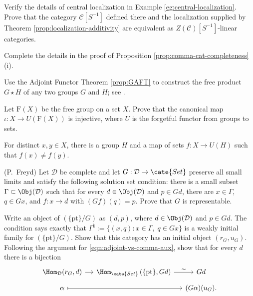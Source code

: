 \begin{Exercises}
	\item Verify the details of central localization in Example
	\ref{eg:central-localization}. Prove that the category
	$\mathcal{C}[S^{-1}]$ defined there and the localization supplied by
	Theorem \ref{prop:localization-additivity} are equivalent as
	$Z(\mathcal{C})[S^{-1}]$-linear categories.

	\item Complete the details in the proof of Proposition
	\ref{prop:comma-cat-completeness}(i).

	\item Use the Adjoint Functor Theorem \ref{prop:GAFT} to construct the free
	product $G\star H$ of any two groups $G$ and $H$; see
	\cite[Definition 4.8.9]{Li1}.

	\item Let $\mathrm{F}(X)$ be the free group on a set $X$. Prove that the
	canonical map $\iota:X\to U(\mathrm{F}(X))$ is injective, where $U$ is the
	forgetful functor from groups to sets.
	\begin{hint}
		For distinct $x,y\in X$, there is a group $H$ and a map of sets
		$f:X\to U(H)$ such that $f(x)\ne f(y)$.
	\end{hint}

	\item (P.\ Freyd) Let $\mathcal{D}$ be complete and let
	$G:\mathcal{D}\to\cate{Set}$ preserve all small limits and satisfy the
	following solution set condition: there is a small subset
	$\Gamma\subset\Obj(\mathcal{D})$ such that for every
	$d\in\Obj(\mathcal{D})$ and $p\in Gd$, there are $x\in\Gamma$, $q\in Gx$,
	and $f:x\to d$ with $(Gf)(q)=p$. Prove that $G$ is representable.

	\begin{hint}
		Write an object of $\left(\{\mathrm{pt}\}/G\right)$ as $(d,p)$, where
		$d\in\Obj(\mathcal{D})$ and $p\in Gd$. The condition says exactly that
		$\Gamma^\natural:=\{(x,q):x\in\Gamma,\;q\in Gx\}$ is a weakly initial
		family for $\left(\{\mathrm{pt}\}/G\right)$. Show that this category
		has an initial object $(r_G,u_G)$. Following the argument for
		\eqref{eqn:adjoint-vs-comma-aux}, show that for every $d$ there is a
		bijection
		\[\begin{tikzcd}[row sep=tiny, column sep=small]
			\Hom_{\mathcal{D}}(r_G, d) \arrow[r] & \Hom_{\cate{Set}}\left( \{\mathrm{pt}\}, Gd \right) \arrow[r, "\sim"] & Gd \\
			\alpha \arrow[mapsto, rr] & & (G\alpha)(u_G) .
		\end{tikzcd}\]
	\end{hint}
\end{Exercises}
